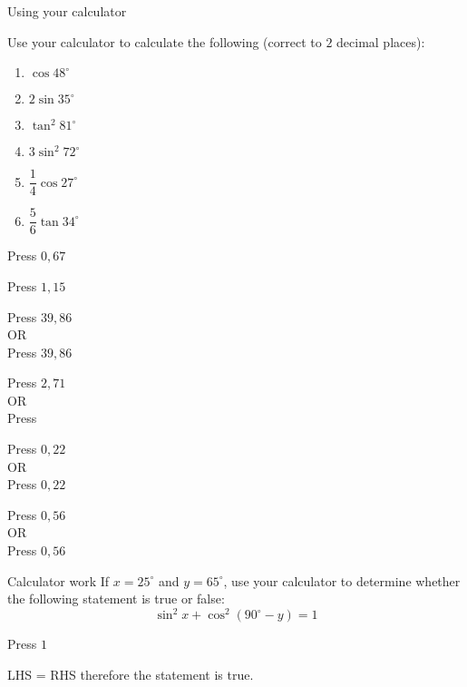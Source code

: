 \begin{wex}{Using your calculator}
{Use your calculator to calculate the following (correct to $2$ decimal places):
  \begin{enumerate}[itemsep=4pt, label=\textbf{\arabic*}. ] 
  \item $\cos 48^{\circ}$
  \item $2 \sin 35^{\circ}$
  \item $\tan^{2} 81^{\circ}$
  \item $3 \sin^{2} 72^{\circ}$
  \item $\dfrac{1}{4} \cos 27^{\circ}$
  \item $\dfrac{5}{6} \tan 34^{\circ}$
  \end{enumerate}
}
{
\westep{}
Press   \fbox{\LARGE =} $0,67$

\westep{}
Press    \fbox{\LARGE =} $1,15$

\westep{}
Press \fbox{(}   \fbox{)}   \fbox{\LARGE =} $39,86$
\\
OR\\
Press   \fbox{\LARGE =}   \fbox{\LARGE =} $39,86$

\westep{}
Press  \fbox{(}   \fbox{)}  \fbox{\LARGE =} $2,71$
\\
OR\\
Press   \fbox{\LARGE =}   \fbox{\LARGE =}  \fbox{$\times$} 

\westep{}
Press \fbox{(}  \fbox{$\div$}  \fbox{)}   \fbox{\LARGE =} $0,22$
\\
OR\\
Press   \fbox{\LARGE =}  \fbox{$\div$}  \fbox{\LARGE =} $0,22$

\westep{}
Press \fbox{(}  \fbox{$\div$}  \fbox{)}   \fbox{\LARGE =} $0,56$
\\
OR\\
Press   \fbox{\LARGE =}  \fbox{$\times$}  \fbox{$\div$}  \fbox{\LARGE =} $0,56$
}
\end{wex}

\begin{wex}
{Calculator work}
{If $x=25^{\circ}$ and $y=65^{\circ}$, use your calculator to determine whether the following statement is true or false:
\begin{equation*}
  \sin^{2} x + \cos^{2} (90^{\circ}-y) = 1
\end{equation*}
}
{
Press \fbox{(}   \fbox{)}  \fbox{\LARGE +} \fbox{(}  \fbox{(}  \fbox{\LARGE -}  \fbox{)} \fbox{)}   \fbox{\LARGE =} $1$


LHS = RHS therefore the statement is true.
}
\end{wex}

